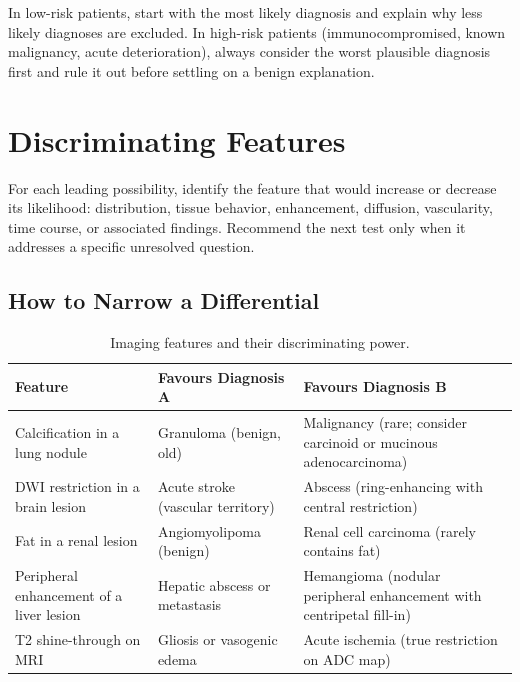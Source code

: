 \begin{pearlbox}
In low-risk patients, start with the most likely diagnosis and explain why less likely diagnoses are excluded. In high-risk patients (immunocompromised, known malignancy, acute deterioration), always consider the worst plausible diagnosis first and rule it out before settling on a benign explanation.
\end{pearlbox}

\section{Discriminating Features}
For each leading possibility, identify the feature that would increase or decrease its likelihood: distribution, tissue behavior, enhancement, diffusion, vascularity, time course, or associated findings. Recommend the next test only when it addresses a specific unresolved question.

\subsection{How to Narrow a Differential}

\begin{table}[h]
\centering
\caption{Imaging features and their discriminating power.}
\label{tab:discriminating_features}
\begin{tabular}{p{4cm} p{4.5cm} p{5cm}}
\toprule
\textbf{Feature} & \textbf{Favours Diagnosis A} & \textbf{Favours Diagnosis B} \\
\midrule
Calcification in a lung nodule & Granuloma (benign, old) & Malignancy (rare; consider carcinoid or mucinous adenocarcinoma) \\
DWI restriction in a brain lesion & Acute stroke (vascular territory) & Abscess (ring-enhancing with central restriction) \\
Fat in a renal lesion & Angiomyolipoma (benign) & Renal cell carcinoma (rarely contains fat) \\
Peripheral enhancement of a liver lesion & Hepatic abscess or metastasis & Hemangioma (nodular peripheral enhancement with centripetal fill-in) \\
T2 shine-through on MRI & Gliosis or vasogenic edema & Acute ischemia (true restriction on ADC map) \\
\bottomrule
\end{tabular}
\end{table}

